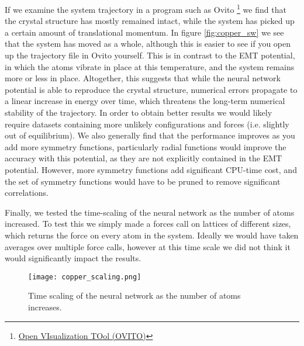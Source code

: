 If we examine the system trajectory in a program such as Ovito
\footnote{\href{https://www.ovito.org/}{Open VIsualization TOol (OVITO)}}
we find that the crystal structure has mostly remained intact, while the
system has picked up a certain amount of translational momentum.
In figure \ref{fig:copper_sw} we see that the system has moved as a whole,
although this is easier to see if you open up the trajectory file in Ovito
yourself.
This is in contrast to the EMT potential, in which the atoms vibrate in place
at this temperature, and the system remains more or less in place.
Altogether, this suggests that while the neural network potential
is able to reproduce the crystal structure, numerical errors propagate
to a linear increase in energy over time, which threatens the long-term numerical
stability of the trajectory. In order to obtain better results we would likely
require datasets containing more unlikely configurations and forces
(i.e. slightly out of equilibrium). We also generally find that the performance
improves as you add more symmetry functions, particularly radial functions
would improve the accuracy with this potential, as they are not explicitly
contained in the EMT potential. However, more symmetry functions
add significant CPU-time cost, and the set of symmetry functions would have to be pruned
to remove significant correlations.
\par
Finally, we tested the time-scaling of the neural network as the number of atoms
increased. To test this we simply made a forces call on lattices of different
sizes, which returns the force on every atom in the system.
Ideally we would have taken averages over multiple force calls, however
at this time scale we did not think it would significantly impact the results.

\begin{figure}
\texttt{[image: copper\_scaling.png]}
\caption{Time scaling of the neural network as the number of atoms increases.}
\label{fig:copper-scaling}
\end{figure}


